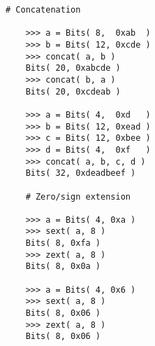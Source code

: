 

  \begin{lstlisting}[gobble=4]
    # Concatenation

    >>> a = Bits( 8,  0xab  )
    >>> b = Bits( 12, 0xcde )
    >>> concat( a, b )
    Bits( 20, 0xabcde )
    >>> concat( b, a )
    Bits( 20, 0xcdeab )

    >>> a = Bits( 4,  0xd   )
    >>> b = Bits( 12, 0xead )
    >>> c = Bits( 12, 0xbee )
    >>> d = Bits( 4,  0xf   )
    >>> concat( a, b, c, d )
    Bits( 32, 0xdeadbeef )

    # Zero/sign extension

    >>> a = Bits( 4, 0xa )
    >>> sext( a, 8 )
    Bits( 8, 0xfa )
    >>> zext( a, 8 )
    Bits( 8, 0x0a )

    >>> a = Bits( 4, 0x6 )
    >>> sext( a, 8 )
    Bits( 8, 0x06 )
    >>> zext( a, 8 )
    Bits( 8, 0x06 )
  \end{lstlisting}

  \captionsetup{justification=centering}
  \label{code-tut3-basics-bits-ops3}

